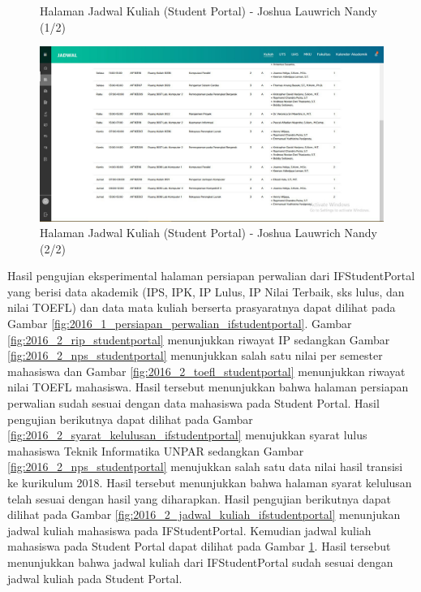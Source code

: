 \begin{itemize}
\begin{enumerate}
\begin{figure}[H]
			\caption{Halaman Jadwal Kuliah (Student Portal) - Joshua Lauwrich Nandy (1/2)}
			\label{fig:2016_2_jadwal_kuliah_studentportal}
		\end{figure}
		\begin{figure}[H]
			\centering
			\includegraphics[scale=0.45]{Gambar/HasilPengujian/2016_2_jadwal_kuliah_studentportal_2}
			\caption{Halaman Jadwal Kuliah (Student Portal) - Joshua Lauwrich Nandy (2/2)}
			\label{fig:2016_2_jadwal_kuliah_studentportal_2}
		\end{figure}
		Hasil pengujian eksperimental halaman persiapan perwalian dari IFStudentPortal yang berisi data akademik (IPS, IPK, IP Lulus, IP Nilai Terbaik, sks lulus, dan nilai TOEFL) dan data mata kuliah berserta prasyaratnya dapat dilihat pada Gambar \ref{fig:2016_1_persiapan_perwalian_ifstudentportal}. Gambar \ref{fig:2016_2_rip_studentportal} menunjukkan riwayat IP sedangkan Gambar \ref{fig:2016_2_nps_studentportal} menunjukkan salah satu nilai per semester mahasiswa dan Gambar \ref{fig:2016_2_toefl_studentportal} menunjukkan riwayat nilai TOEFL mahasiswa. Hasil tersebut menunjukkan bahwa halaman persiapan perwalian sudah sesuai dengan data mahasiswa pada Student Portal. Hasil pengujian berikutnya dapat dilihat pada Gambar \ref{fig:2016_2_syarat_kelulusan_ifstudentportal} menujukkan syarat lulus mahasiswa Teknik Informatika UNPAR sedangkan Gambar \ref{fig:2016_2_nps_studentportal} menujukkan salah satu data nilai hasil transisi ke kurikulum 2018. Hasil tersebut menunjukkan bahwa halaman syarat kelulusan telah sesuai dengan hasil yang diharapkan. Hasil pengujian berikutnya dapat dilihat pada Gambar \ref{fig:2016_2_jadwal_kuliah_ifstudentportal} menunjukan jadwal kuliah mahasiswa pada IFStudentPortal. Kemudian jadwal kuliah mahasiswa pada Student Portal dapat dilihat pada Gambar \ref{fig:2016_2_jadwal_kuliah_studentportal}. Hasil tersebut menunjukkan bahwa jadwal kuliah dari IFStudentPortal sudah sesuai dengan jadwal kuliah pada Student Portal.

\end{enumerate}
\end{itemize}
